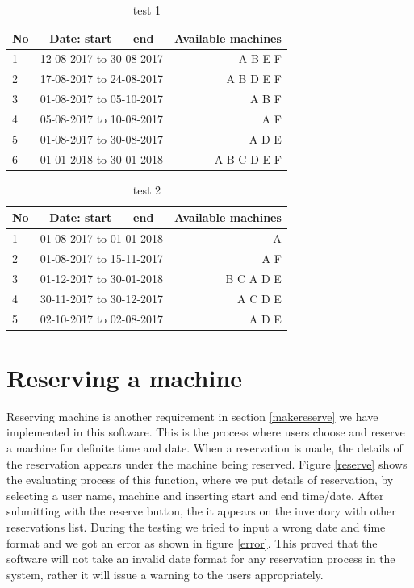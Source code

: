 \begin{table}[h!]
  \centering
  \label{tab:table1}
  \begin{tabular}{l|c||r}
    No & Date: start --- end & Available machines\\
    \hline
    1 &12-08-2017 to 30-08-2017  & A B E F \\
    2 &17-08-2017 to 24-08-2017  & A B D E F\\
    3 &01-08-2017 to 05-10-2017  & A B F \\
    4 &05-08-2017 to 10-08-2017  & A F \\
    5 &01-08-2017 to 30-08-2017  & A D E  \\
    6 &01-01-2018 to 30-01-2018  & A B C D E F \\
  \end{tabular}
  \caption{test 1}
\end{table}

\begin{table}[h!]
  \centering
  \label{tab:table1}
  \begin{tabular}{l|c||r}
    No & Date: start --- end & Available machines\\
    \hline
    1 &01-08-2017 to 01-01-2018  & A \\
    2 &01-08-2017 to 15-11-2017  & A F\\
    3 &01-12-2017 to 30-01-2018  & B C A D E \\
    4 &30-11-2017 to 30-12-2017  & A  C D E\\
    5 &02-10-2017 to 02-08-2017  & A  D E \\
  \end{tabular}
  \caption{test 2}
\end{table}

\pagebreak
\section*{Reserving a machine}
Reserving machine is another requirement in section \ref{makereserve} we have implemented in this software. This is the process where users choose and reserve a machine for definite time and date. When a reservation is made, the details of the reservation appears under the machine being reserved. Figure \ref{reserve} shows the evaluating process of this function, where we put details of reservation, by selecting a user name, machine and inserting start and end time/date. After submitting with the reserve button, the it appears on the inventory with other reservations list. During the testing we tried to input a wrong date and time format and we got an error as shown in figure \ref{error}. This proved that the software will not take an invalid date format for any reservation process in the system, rather it will issue a warning to the users appropriately.

